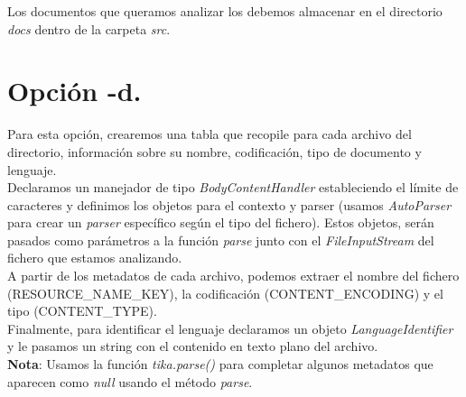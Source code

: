 \documentclass[12pt]{article}
\begin{document}
Los documentos que queramos analizar los debemos almacenar en el directorio \textit{docs} dentro de la carpeta \textit{src}.

\section{Opción \textbf{-d}.}

Para esta opción, crearemos una tabla que recopile para cada archivo del directorio, información sobre su nombre, codificación, tipo de documento y lenguaje.\\

Declaramos un manejador de tipo \textit{BodyContentHandler} estableciendo el límite de caracteres y definimos los objetos para el contexto y parser (usamos \textit{AutoParser} para crear un \textit{parser} específico según el tipo del fichero). Estos objetos, serán pasados como parámetros a la función \textit{parse} junto con el \textit{FileInputStream} del fichero que estamos analizando.\\ 

A partir de los metadatos de cada archivo, podemos extraer el nombre del fichero (RESOURCE\_NAME\_KEY), la codificación (CONTENT\_ENCODING) y el tipo (CONTENT\_TYPE).\cite{Guion}\\

Finalmente, para identificar el lenguaje declaramos un objeto \textit{LanguageIdentifier} y le pasamos un string con el contenido en texto plano del archivo.\\ 

\textbf{Nota}: Usamos la función \textit{tika.parse()} para completar algunos metadatos que aparecen como \textit{null} usando el método \textit{parse}.\\
\end{document}
